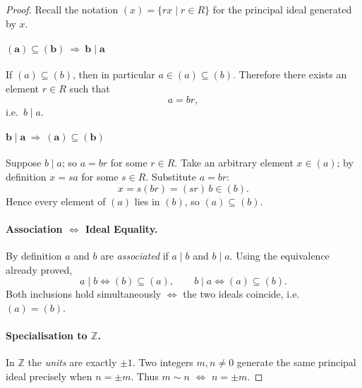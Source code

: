 \documentclass[12pt]{article}
\theoremstyle{definition} %
\theoremstyle{plain} %
\begin{document}
\begin{proof}
  Recall the notation \((x)=\{rx \mid r\in R\}\) for the principal ideal generated by \(x\).

  \paragraph{\(\boldsymbol{(a)\subseteq(b)\ \Rightarrow\ b\mid a}\)}
  If \((a)\subseteq(b)\), then in particular \(a\in(a)\subseteq(b)\).  
  Therefore there exists an element \(r\in R\) such that
  \[
      a = br ,
  \]
  i.e.\ \(b\mid a\).

  \paragraph{\(\boldsymbol{b\mid a\ \Rightarrow\ (a)\subseteq(b)}\)}
  Suppose \(b\mid a\); so \(a = br\) for some \(r\in R\).  
  Take an arbitrary element \(x\in(a)\); by definition \(x = sa\) for some \(s\in R\).  
  Substitute \(a=br\):
  \[
      x = s(br) = (sr)\,b \in (b) .
  \]
  Hence every element of \((a)\) lies in \((b)\), so \((a)\subseteq(b)\).

  \paragraph{Association \(\Longleftrightarrow\) Ideal Equality.}
  By definition \(a\) and \(b\) are \emph{associated} if \(a\mid b\) and \(b\mid a\).  
  Using the equivalence already proved,
  \[
     a\mid b \Longleftrightarrow (b)\subseteq(a),
     \qquad
     b\mid a \Longleftrightarrow (a)\subseteq(b).
  \]
  Both inclusions hold simultaneously \(\Longleftrightarrow\) the two ideals
  coincide, i.e.\ \((a)=(b)\).

  \paragraph{Specialisation to \(\mathbb Z\).}
  In \(\mathbb Z\) the \emph{units} are exactly \(\pm1\).  
  Two integers \(m,n\neq0\) generate the same principal ideal precisely when
  \(n=\pm m\).  Thus \(m\sim n\) \(\iff\) \(n=\pm m\).
\end{proof}
\end{document}
